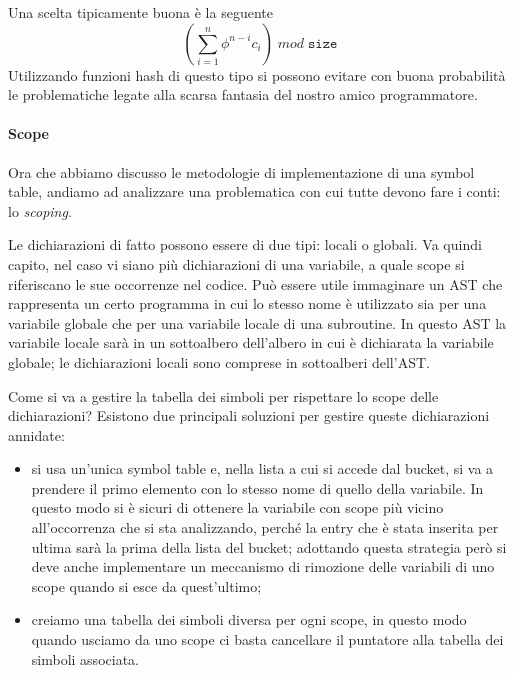\documentclass[class=book, crop=false, oneside, 12pt]{standalone}
\begin{document}
Una scelta tipicamente buona è la seguente
\begin{equation}
    (\sum_{i=1}^{n} \phi^{n-i}c_i) \; mod \; \texttt{size}
\end{equation}
Utilizzando funzioni hash di questo tipo si possono evitare con buona probabilità le problematiche legate alla scarsa fantasia del nostro amico programmatore.

\paragraph{Scope} Ora che abbiamo discusso le metodologie di implementazione di una symbol table, andiamo ad analizzare una problematica con cui tutte devono fare i conti: lo \emph{scoping}.

Le dichiarazioni di fatto possono essere di due tipi: locali o globali.
Va quindi capito, nel caso vi siano più dichiarazioni di una variabile, a quale scope si riferiscano le sue occorrenze nel codice.
Può essere utile immaginare un AST che rappresenta un certo programma in cui lo stesso nome è utilizzato sia per una variabile globale che per una variabile locale di una subroutine.
In questo AST la variabile locale sarà in un sottoalbero dell'albero in cui è dichiarata la variabile globale; le dichiarazioni locali sono comprese in sottoalberi dell'AST.

Come si va a gestire la tabella dei simboli per rispettare lo scope delle dichiarazioni?
\noindent
Esistono due principali soluzioni per gestire queste dichiarazioni annidate:
\begin{itemize}
    \item si usa un'unica symbol table e, nella lista a cui si accede dal bucket, si va a prendere il primo elemento con lo stesso nome di quello della variabile. In questo modo si è sicuri di ottenere la variabile con scope più vicino all'occorrenza che si sta analizzando, perché la entry che è stata inserita per ultima sarà la prima della lista del bucket; adottando questa strategia però si deve anche implementare un meccanismo di rimozione delle variabili di uno scope quando si esce da quest'ultimo;
    \item creiamo una tabella dei simboli diversa per ogni scope, in questo modo quando usciamo da uno scope ci basta cancellare il puntatore alla tabella dei simboli associata.
\end{itemize}
\end{document}
